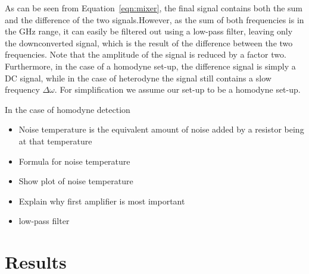 \documentclass[12pt]{report}
\begin{document}
As can be seen from Equation~\ref{eqn:mixer}, the final signal contains both the sum and the difference of the two signals.However, as the sum of both frequencies is in the GHz range, it can easily be filtered out using a low-pass filter, leaving only the downconverted signal, which is the result of the difference between the two frequencies. Note that the amplitude of the signal is reduced by a factor two. Furthermore, in the case of a homodyne set-up, the difference signal is simply a DC signal, while in the case of heterodyne the signal still contains a slow frequency $\Delta \omega$. For simplification we assume our set-up to be a homodyne set-up.

In the case of homodyne detection



\begin{itemize}
    \item Noise temperature is the equivalent amount of noise added by a resistor being at that temperature
    \item Formula for noise temperature
    \item Show plot of noise temperature
    \item Explain why first amplifier is most important
    \item low-pass filter
\end{itemize}




\section{Results}
\label{sec:noise_results}








\end{document}
